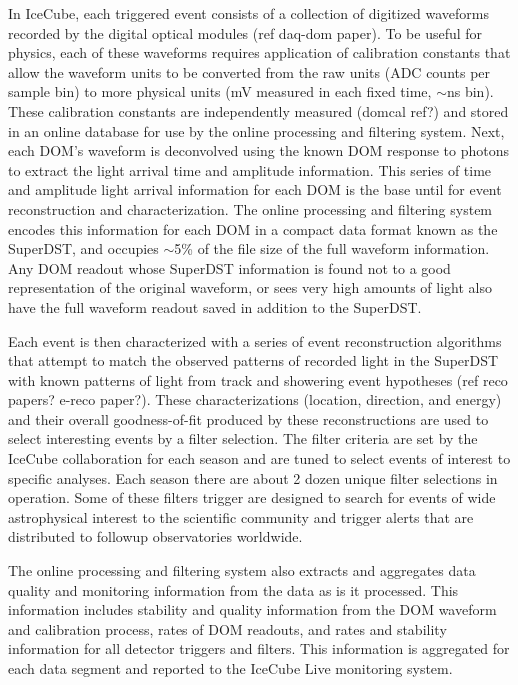 In IceCube, each triggered event consists of a collection of digitized waveforms recorded by the digital optical modules (ref daq-dom paper).
To be useful for physics, each of these waveforms requires application of calibration constants that allow the waveform units
to be converted from the raw units (ADC counts per sample bin) to more physical units (mV measured in each fixed time, $\sim$ns bin).  These
calibration constants are independently measured (domcal ref?) and stored in an online database for use by
the online processing and filtering system.  Next, each DOM's waveform is deconvolved using the known DOM response
to photons to extract the light arrival time and amplitude information.  This series of time and amplitude light arrival information
for each DOM is the base until for event reconstruction and characterization.  The online processing and filtering system encodes
this information for each DOM in a compact data format known as the SuperDST, and occupies $\sim$5\%  of the file size
of the full waveform information.  Any DOM readout whose SuperDST information is found not to a good representation of the
original waveform, or sees very high amounts of light also have the full waveform readout saved in addition to the SuperDST.

Each event is then characterized with a series of event reconstruction algorithms that attempt to match
the observed patterns of recorded light in the SuperDST with known patterns of light
from track and showering event hypotheses (ref reco papers?  e-reco paper?).  These characterizations (location, direction, and energy) and their 
overall goodness-of-fit produced by these reconstructions are used to select interesting 
events by a filter selection.  The filter criteria are set by the IceCube collaboration for each season
and are tuned to select events of interest to specific analyses.  Each season there are
about 2 dozen unique filter selections in operation.  Some of these filters trigger are
designed to search for events of wide astrophysical interest to the scientific community and trigger
alerts that are distributed to followup observatories worldwide.

The online processing and filtering system also extracts and aggregates data quality and monitoring information
from the data as is it processed.  This information includes stability and quality information from the
DOM waveform and calibration process, rates of DOM readouts, and rates and stability
information for all detector triggers and filters.  This information is aggregated for each data segment and
reported to the IceCube Live monitoring system.  

